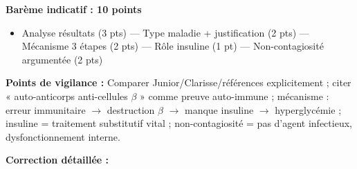 \documentclass[11pt]{article}
\begin{document}
\begin{corrige}
\textbf{Barème indicatif : 10 points}
\begin{itemize}
\item Analyse résultats (3 pts) — Type maladie + justification (2 pts) — Mécanisme 3 étapes (2 pts) — Rôle insuline (1 pt) — Non-contagiosité argumentée (2 pts)
\end{itemize}
\textbf{Points de vigilance :} Comparer Junior/Clarisse/références explicitement ; citer « auto-anticorps anti-cellules $\beta$ » comme preuve auto-immune ; mécanisme : erreur immunitaire $\rightarrow$ destruction $\beta$ $\rightarrow$ manque insuline $\rightarrow$ hyperglycémie ; insuline = traitement substitutif vital ; non-contagiosité = pas d'agent infectieux, dysfonctionnement interne.

\medskip
\textbf{Correction détaillée :}


\end{corrige}
\end{document}
